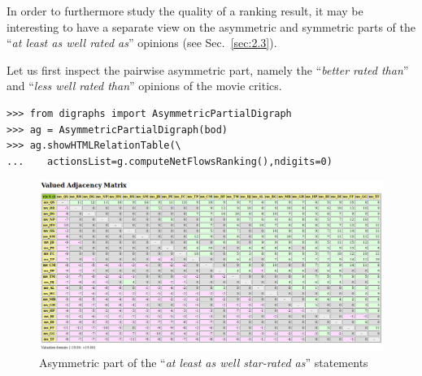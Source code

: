 In order to furthermore study the quality of a ranking result, it may be interesting to have a separate view on the asymmetric and symmetric parts of the ``\emph{at least as well rated as}'' opinions (see Sec.~\ref{sec:2.3}).

Let us first inspect the pairwise asymmetric part, namely the ``\emph{better rated than}'' and ``\emph{less well rated than}'' opinions of the movie critics. 
\begin{lstlisting}
>>> from digraphs import AsymmetricPartialDigraph
>>> ag = AsymmetricPartialDigraph(bod)
>>> ag.showHTMLRelationTable(\
...    actionsList=g.computeNetFlowsRanking(),ndigits=0)
\end{lstlisting}
\begin{figure}[ht]
\includegraphics[width=\hsize]{Figures/16-5-asymmetricPart.png}
\caption{Asymmetric part of the ``\emph{at least as well star-rated as}'' statements}
\label{fig:16.5}       %
\end{figure}

